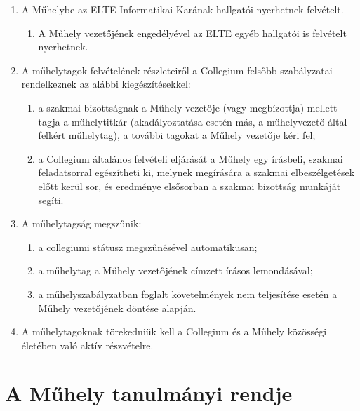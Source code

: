 \documentclass{../styles/rulebook}
\begin{document}
\begin{enumerate}
	\item A Műhelybe az ELTE Informatikai Karának hallgatói nyerhetnek felvételt.
	\begin{enumerate}
		\item A Műhely vezetőjének engedélyével az ELTE egyéb hallgatói is felvételt nyerhetnek.
	\end{enumerate}
	\item A műhelytagok felvételének részleteiről a Collegium felsőbb szabályzatai rendelkeznek az alábbi kiegészítésekkel:
	\begin{enumerate}
		\item a szakmai bizottságnak a Műhely vezetője (vagy megbízottja) mellett tagja a műhelytitkár (akadályoztatása esetén más, a műhelyvezető által felkért műhelytag), a további tagokat a Műhely vezetője kéri fel;
		\item a Collegium általános felvételi eljárását a Műhely egy írásbeli, szakmai feladatsorral egészítheti ki, melynek megírására a szakmai elbeszélgetések előtt kerül sor, és eredménye elsősorban a szakmai bizottság munkáját segíti.
	\end{enumerate}
	\item A műhelytagság megszűnik:
	\begin{enumerate}
		\item a collegiumi státusz megszűnésével automatikusan;
		\item a műhelytag a Műhely vezetőjének címzett írásos lemondásával;
		\item a műhelyszabályzatban foglalt követelmények nem teljesítése esetén a Műhely vezetőjének döntése alapján.
	\end{enumerate}
	\item A műhelytagoknak törekedniük kell a Collegium és a Műhely közösségi életében való aktív részvételre.
\end{enumerate}

\section{A Műhely tanulmányi rendje}
\end{document}
